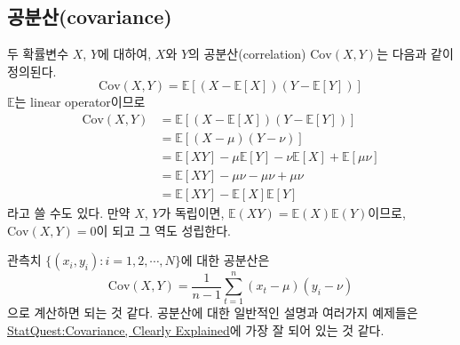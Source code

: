\documentclass{article}
\begin{document}
\subsection{공분산(covariance)}
두 확률변수 \(X\), \(Y\)에 대하여, \(X\)와 \(Y\)의 공분산(correlation) \(\text{Cov}(X,Y)\)는  다음과 같이 정의된다.
\begin{equation}
\text{Cov}(X,Y)=\mathbb E[(X-\mathbb E[X])(Y-\mathbb E[Y])]
\end{equation}
\(\mathbb E\)는 linear operator이므로
\begin{align*}
\text{Cov}(X,Y)
&=\mathbb E[(X-\mathbb E[X])(Y-\mathbb E[Y])]\\
&=\mathbb E[(X-\mu)(Y-\nu)]\\
&=\mathbb E[XY]-\mu\mathbb E[Y]-\nu\mathbb E[X]+\mathbb E[\mu\nu]\\
&=\mathbb E[XY]-\mu\nu-\mu\nu+\mu\nu\\
&=\mathbb E[XY]-\mathbb E[X]\mathbb E[Y]
\end{align*}
라고 쓸 수도 있다.
만약 \(X\), \(Y\)가 독립이면, \(\mathbb E(XY)=\mathbb E(X)\mathbb E(Y)\)이므로, \(\text{Cov}(X,Y)=0\)이 되고 그 역도 성립한다.

관측치 \(\{(x_i, y_i):i=1,2,\cdots,N\}\)에 대한 공분산은
\[\text{Cov}(X,Y)=\frac1{n-1}\sum_{t=1}^n(x_t-\mu)(y_i-\nu)\]
으로 계산하면 되는 것 같다.
공분산에 대한 일반적인 설명과 여러가지 예제들은 \href{https://youtu.be/qtaqvPAeEJY}{StatQuest:Covariance, Clearly Explained}에 가장 잘 되어 있는 것 같다.

\end{document}
